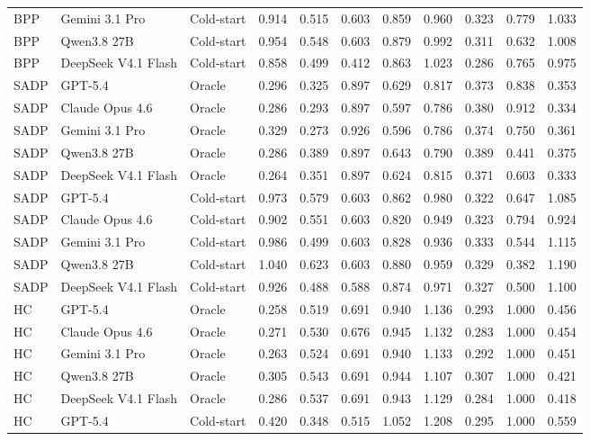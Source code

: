 \begin{table}[pos=!htbp]
\begin{tabular*}{\textwidth}{@{\extracolsep{\fill}}lllcccccccc@{}}
BPP & Gemini 3.1 Pro & Cold-start & 0.914 & 0.515 & 0.603 & 0.859 & 0.960 & 0.323 & 0.779 & 1.033 \\
BPP & Qwen3.8 27B & Cold-start & 0.954 & 0.548 & 0.603 & 0.879 & 0.992 & 0.311 & 0.632 & 1.008 \\
BPP & DeepSeek V4.1 Flash & Cold-start & 0.858 & 0.499 & 0.412 & 0.863 & 1.023 & 0.286 & 0.765 & 0.975 \\
\addlinespace[2pt]
SADP & GPT-5.4 & Oracle & 0.296 & 0.325 & 0.897 & 0.629 & 0.817 & 0.373 & 0.838 & 0.353 \\
SADP & Claude Opus 4.6 & Oracle & 0.286 & 0.293 & 0.897 & 0.597 & 0.786 & 0.380 & 0.912 & 0.334 \\
SADP & Gemini 3.1 Pro & Oracle & 0.329 & 0.273 & 0.926 & 0.596 & 0.786 & 0.374 & 0.750 & 0.361 \\
SADP & Qwen3.8 27B & Oracle & 0.286 & 0.389 & 0.897 & 0.643 & 0.790 & 0.389 & 0.441 & 0.375 \\
SADP & DeepSeek V4.1 Flash & Oracle & 0.264 & 0.351 & 0.897 & 0.624 & 0.815 & 0.371 & 0.603 & 0.333 \\
SADP & GPT-5.4 & Cold-start & 0.973 & 0.579 & 0.603 & 0.862 & 0.980 & 0.322 & 0.647 & 1.085 \\
SADP & Claude Opus 4.6 & Cold-start & 0.902 & 0.551 & 0.603 & 0.820 & 0.949 & 0.323 & 0.794 & 0.924 \\
SADP & Gemini 3.1 Pro & Cold-start & 0.986 & 0.499 & 0.603 & 0.828 & 0.936 & 0.333 & 0.544 & 1.115 \\
SADP & Qwen3.8 27B & Cold-start & 1.040 & 0.623 & 0.603 & 0.880 & 0.959 & 0.329 & 0.382 & 1.190 \\
SADP & DeepSeek V4.1 Flash & Cold-start & 0.926 & 0.488 & 0.588 & 0.874 & 0.971 & 0.327 & 0.500 & 1.100 \\
\addlinespace[2pt]
HC & GPT-5.4 & Oracle & 0.258 & 0.519 & 0.691 & 0.940 & 1.136 & 0.293 & 1.000 & 0.456 \\
HC & Claude Opus 4.6 & Oracle & 0.271 & 0.530 & 0.676 & 0.945 & 1.132 & 0.283 & 1.000 & 0.454 \\
HC & Gemini 3.1 Pro & Oracle & 0.263 & 0.524 & 0.691 & 0.940 & 1.133 & 0.292 & 1.000 & 0.451 \\
HC & Qwen3.8 27B & Oracle & 0.305 & 0.543 & 0.691 & 0.944 & 1.107 & 0.307 & 1.000 & 0.421 \\
HC & DeepSeek V4.1 Flash & Oracle & 0.286 & 0.537 & 0.691 & 0.943 & 1.129 & 0.284 & 1.000 & 0.418 \\
HC & GPT-5.4 & Cold-start & 0.420 & 0.348 & 0.515 & 1.052 & 1.208 & 0.295 & 1.000 & 0.559 \\

\end{tabular*}
\end{table}
